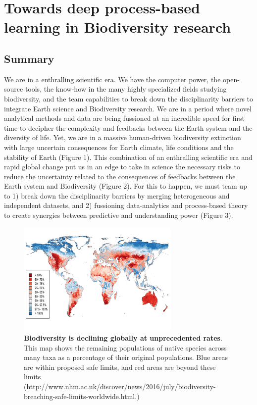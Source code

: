 \documentclass[authoryear,1p,12pt]{elsarticle}
\begin{document}
\section{{\large Towards deep process-based learning in Biodiversity research}}


\subsection{{\bf Summary}}
We are in a enthralling scientific era. We have the computer power,
the open-source tools, the know-how in the many highly specialized
fields studying biodiversity, and the team capabilities to break down
the disciplinarity barriers to integrate Earth science and
Biodiversity research. We are in a period where novel analytical
methods and data are being fussioned at an incredible speed for first
time to decipher the complexity and feedbacks between the Earth system
and the diversity of life. Yet, we are in a massive human-driven
biodiversity extinction with large uncertain consequences for Earth
climate, life conditions and the stability of Earth (Figure 1). This
combination of an enthralling scientific era and rapid global change
put us in an edge to take in science the necessary risks to reduce the
uncertainty related to the consequences of feedbacks between the Earth
system and Biodiversity (Figure 2). For this to happen, we must team
up to 1) break down the disciplinarity barriers by merging
heterogeneous and independent datasets, and 2) fussioning
data-analytics and process-based theory to create synergies between
predictive and understanding power (Figure 3).

\begin{figure}
  \begin{center}
       \includegraphics[width=0.7\textwidth]{Figure1}
     \end{center}
     \vspace{-0.7 in}
     \caption{{\bf Biodiversity is declining globally at unprecedented
         rates}. This map shows the remaining populations of native
       species across many taxa as a percentage of their original
       populations. Blue areas are within proposed safe limits, and
       red areas are beyond these limits
       ({http://www.nhm.ac.uk/discover/news/2016/july/biodiversity-breaching-safe-limits-worldwide.html}.)}
\end{figure}
\end{document}
